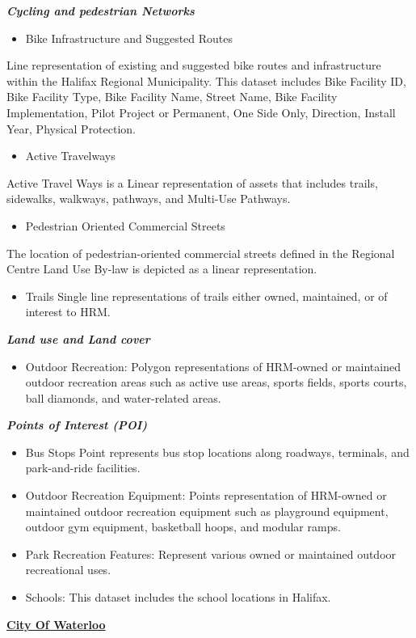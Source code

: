 \documentclass[12pt,twoside]{reedthesis}
\providecommand{\tightlist}{%
  \setlength{\itemsep}{0pt}\setlength{\parskip}{0pt}}
\begin{document}
\textbf{\emph{Cycling and pedestrian Networks}}
\begin{itemize}
\tightlist
\item
  Bike Infrastructure and Suggested Routes
\end{itemize}
Line representation of existing and suggested bike routes and infrastructure within the Halifax Regional Municipality. This dataset includes Bike Facility ID, Bike Facility Type, Bike Facility Name, Street Name, Bike Facility Implementation, Pilot Project or Permanent, One Side Only, Direction, Install Year, Physical Protection.
\begin{itemize}
\tightlist
\item
  Active Travelways
\end{itemize}
Active Travel Ways is a Linear representation of assets that includes trails, sidewalks, walkways, pathways, and Multi-Use Pathways.
\begin{itemize}
\tightlist
\item
  Pedestrian Oriented Commercial Streets
\end{itemize}
The location of pedestrian-oriented commercial streets defined in the Regional Centre Land Use By-law is depicted as a linear representation.
\begin{itemize}
\tightlist
\item
  Trails Single line representations of trails either owned, maintained, or of interest to HRM.
\end{itemize}
\textbf{\emph{Land use and Land cover}}
\begin{itemize}
\tightlist
\item
  Outdoor Recreation: Polygon representations of HRM-owned or maintained outdoor recreation areas such as active use areas, sports fields, sports courts, ball diamonds, and water-related areas.
\end{itemize}
\textbf{\emph{Points of Interest (POI)}}
\begin{itemize}
\item
  Bus Stops Point represents bus stop locations along roadways, terminals, and park-and-ride facilities.
\item
  Outdoor Recreation Equipment: Points representation of HRM-owned or maintained outdoor recreation equipment such as playground equipment, outdoor gym equipment, basketball hoops, and modular ramps.
\item
  Park Recreation Features: Represent various owned or maintained outdoor recreational uses.
\item
  Schools: This dataset includes the school locations in Halifax.
\end{itemize}
\textbf{\href{https://data.waterloo.ca/search?tags=base\%20data}{City Of Waterloo}}
\end{document}
